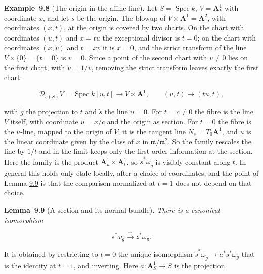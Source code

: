 \documentclass[11pt]{article}
\newenvironment{bpstatement}[2]{\par\addvspace{0.6\baselineskip}\noindent\textbf{#1}#2\textbf{.}\enspace\ignorespaces}
  {\par\addvspace{0.4\baselineskip}}
\newenvironment{bpstatementit}[2]{\begin{bpstatement}{#1}{#2}\itshape\ignorespaces}{\end{bpstatement}}
\begin{document}
\label{bp26}%
\begin{bpstatement}{Example~9.8}{ (The origin in the affine line)}
Let \(S=\operatorname{Spec}k\), \(V=\mathbf A^1_k\) with coordinate \(x\), and let \(s\) be the origin. The blowup of \(V\times\mathbf A^1=\mathbf A^2\), with coordinates \((x,t)\), at the origin is covered by two charts. On the chart with coordinates \((u,t)\) and \(x=tu\) the exceptional divisor is \(t=0\); on the chart with coordinates \((x,v)\) and \(t=xv\) it is \(x=0\), and the strict transform of the line \(V\times\{0\}=\{t=0\}\) is \(v=0\). Since a point of the second chart with \(v\neq0\) lies on the first chart, with \(u=1/v\), removing the strict transform leaves exactly the first chart:

\[
\mathcal D_{s(S)}V=\operatorname{Spec}k[u,t]\longrightarrow
V\times\mathbf A^1,\qquad (u,t)\longmapsto(tu,t),
\]

with \(\widetilde g\) the projection to \(t\) and \(\widetilde s\) the line \(u=0\). For \(t=c\neq0\) the fibre is the line \(V\) itself, with coordinate \(u=x/c\) and the origin as section. For \(t=0\) the fibre is the \(u\)-line, mapped to the origin of \(V\); it is the tangent line \(N_s=T_0\mathbf A^1\), and \(u\) is the linear coordinate given by the class of \(x\) in \(\mathfrak m/\mathfrak m^2\). So the family rescales the line by \(1/t\) and in the limit keeps only the first-order information at the section. Here the family is the product \(\mathbf A^1_u\times\mathbf A^1_t\), so \(\widetilde s^*\omega_{\widetilde g}\) is visibly constant along \(t\). In general this holds only étale locally, after a choice of coordinates, and the point of Lemma \hyperref[bp27]{9.9} is that the comparison normalized at \(t=1\) does not depend on that choice.
\end{bpstatement}

\label{bp27}%
\begin{bpstatementit}{Lemma~9.9}{ (A section and its normal bundle)}
There is a canonical isomorphism

\[
s^{*}\omega_{g}\xrightarrow{\sim}z^{*}\omega_{\pi}.
\tag{9.13}
\]

It is obtained by restricting to \(t=0\) the unique isomorphism \(\widetilde s^{*}\omega_{\widetilde g}\to a^{*}s^{*}\omega_{g}\) that is the identity at \(t=1\), and inverting. Here \(a:\mathbf A^1_S\to S\) is the projection.
\end{bpstatementit}
\end{document}
